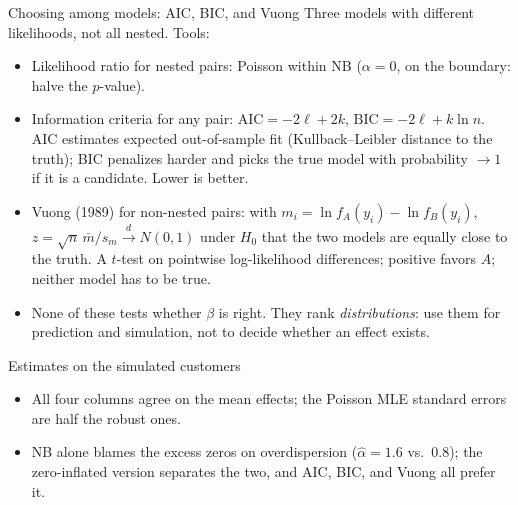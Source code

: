 \documentclass[aspectratio=169,11pt]{beamer}
\begin{document}
\begin{frame}{Choosing among models: AIC, BIC, and Vuong}
Three models with different likelihoods, not all nested. Tools:
\begin{itemize}
	\item \alert{Likelihood ratio} for nested pairs: Poisson within NB ($\alpha = 0$, on the boundary: halve the $p$-value).
	\item \alert{Information criteria} for any pair: $\text{AIC} = -2\ell + 2k$, $\text{BIC} = -2\ell + k\ln n$.
	AIC estimates expected out-of-sample fit (Kullback--Leibler distance to the truth); BIC penalizes harder
	and picks the true model with probability $\to 1$ if it is a candidate. Lower is better.
	\item \alert{Vuong (1989)} for non-nested pairs: with $m_i = \ln f_A(y_i) - \ln f_B(y_i)$,
	$z = \sqrt{n}\,\bar m / s_m \xrightarrow{d} N(0,1)$ under $H_0$ that the two models are equally
	close to the truth. A $t$-test on pointwise log-likelihood differences; positive favors $A$; neither
	model has to be true.
	\item None of these tests whether $\beta$ is right. They rank \emph{distributions}: use them for
	prediction and simulation, not to decide whether an effect exists.
\end{itemize}
\end{frame}


\begin{frame}{Estimates on the simulated customers}
\begin{center}
\scriptsize

\end{center}
\begin{itemize}
	\item All four columns agree on the mean effects; the Poisson MLE standard errors are half the robust ones.
	\item NB alone blames the excess zeros on overdispersion ($\hat\alpha = 1.6$ vs.\ $0.8$); the
	zero-inflated version separates the two, and AIC, BIC, and Vuong all prefer it.
\end{itemize}
\end{frame}
\end{document}

